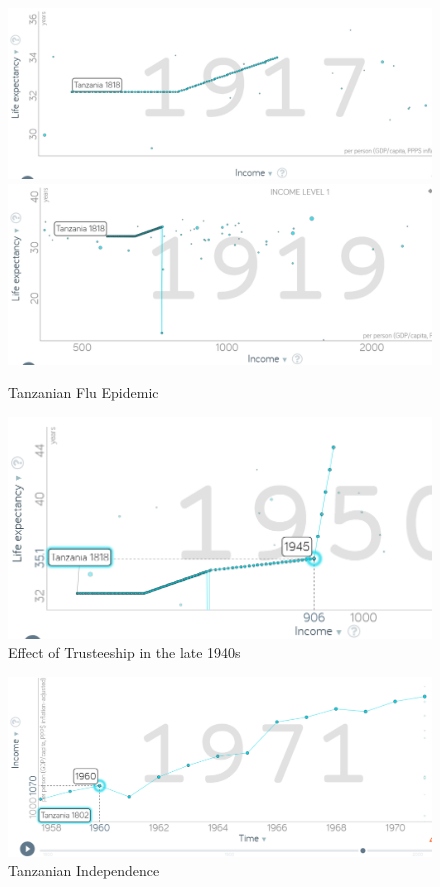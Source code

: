 \documentclass[12pt]{article}
\begin{document}
\begin{figure}[h!]
	\includegraphics[width=0.49\linewidth ,  height=0.37\linewidth]{tanz_1917}
	\includegraphics[width=0.49\linewidth , height=0.37\linewidth]{tanz_1919}
	\caption{Tanzanian Flu Epidemic}
	 \label{fig:tanz1917}
\end{figure}


 \begin{figure}[h!]
 \begin{center}
\includegraphics[width=0.59\linewidth]{tanz_late40s.png}
\caption{Effect of Trusteeship in the late 1940s}
 \label{fig:late40}
 \end{center}
 \end{figure}  
  
      \begin{figure}[h!]
\includegraphics[width=\linewidth, height = 0.37\linewidth]{tanz_1960s_inc.png}
\caption{Tanzanian Independence}
 \label{fig:tanz60s}
 \end{figure}  
\end{document}
